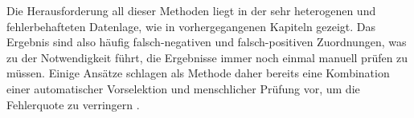 Die Herausforderung all dieser Methoden liegt in der sehr heterogenen und fehlerbehafteten Datenlage, wie in vorhergegangenen Kapiteln gezeigt.
Das Ergebnis sind also häufig falsch-negativen und falsch-positiven Zuordnungen, was zu der Notwendigkeit führt, die Ergebnisse immer noch einmal manuell prüfen zu müssen.
Einige Ansätze schlagen als Methode daher bereits eine Kombination einer automatischer Vorselektion und menschlicher Prüfung vor, um die Fehlerquote zu verringern \autocite{Takahashi_Miyamoto_Nakao_2016, Sanguino_Uetz_2017}.



